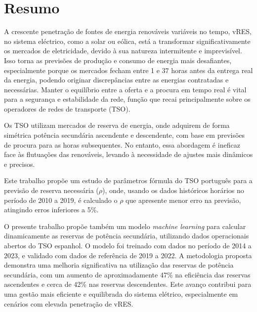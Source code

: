 \chapter{Resumo}
\justifying

A crescente penetração de fontes de energia renováveis variáveis no tempo, vRES, no sistema eléctrico, como a solar ou eólica, está a transformar significativamente os mercados de eletricidade, devido à sua natureza intermitente e imprevisível. Isso torna as previsões de produção e consumo de energia mais desafiantes, especialmente porque os mercados fecham entre 1 e 37 horas antes da entrega real da energia, podendo originar discrepâncias entre as energias contratadas e necessárias. Manter o equilíbrio entre a oferta e a procura em tempo real é vital para a segurança e estabilidade da rede, função que recai principalmente sobre os operadores de redes de transporte (TSO).\par
Os TSO utilizam mercados de reserva de energia, onde adquirem de forma simétrica potência secundária ascendente e descendente, com base em previsões de procura para as horas subsequentes. No entanto, essa abordagem é ineficaz face às flutuações das renováveis, levando à necessidade de ajustes mais dinâmicos e precisos.\par
Este trabalho propõe um estudo de parâmetros fórmula do TSO português para a previsão de reserva necessária ($\rho$), onde, usando os dados históricos horários no período de 2010 a 2019, é calculado o $\rho$ que apresente menor erro na previsão, atingindo erros inferiores a 5\%.\par
O presente trabalho propõe também um modelo \textit{machine learning} para calcular dinamicamente as reservas de potência secundária, utilizando dados operacionais abertos do TSO espanhol. O modelo foi treinado com dados no período de 2014 a 2023, e validado com dados de referência de 2019 a 2022. A metodologia proposta demonstra uma melhoria significativa na utilização das reservas de potência secundária, com um aumento de aproximadamente 47\% na eficiência das reservas ascendentes e cerca de 42\% nas reservas descendentes. Este avanço contribui para uma gestão mais eficiente e equilibrada do sistema elétrico, especialmente em cenários com elevada penetração de vRES.\par




\vspace{0.5cm} %


